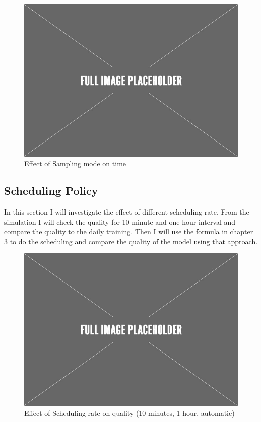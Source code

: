 \begin{figure}[h!]
\centering
\includegraphics[width=\columnwidth]{../images/placeholder.jpeg}
\caption{Effect of Sampling mode on time}
\label{fig:sampling-mode-time}
\vspace{2mm}
\end{figure}



\subsection{Scheduling Policy}
In this section I will investigate the effect of different scheduling rate.
From the simulation I will check the quality for 10 minute and one hour interval and compare the quality to the daily training.
Then I will use the formula in chapter 3 to do the scheduling and compare the quality of the model using that approach.

\begin{figure}[h!]
\centering
\includegraphics[width=\columnwidth]{../images/placeholder.jpeg}
\caption{Effect of Scheduling rate on quality (10 minutes, 1 hour, automatic)}
\label{fig:scheduling-policy-quality}
\vspace{2mm}
\end{figure}

